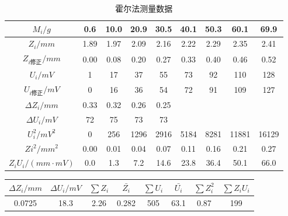 \documentclass[11pt]{article}
\begin{document}
\begin{table}[H]
    \centering
    \caption{霍尔法测量数据}
    \begin{tabular}{|c|c|c|c|c|c|c|c|c|}
    \hline
        $M_i/g$ & 0.6  & 10.0  & 20.9  & 30.5  & 40.1  & 50.3  & 60.1  & 69.9  \\ \hline
        $Z_i/mm$ & 1.89  & 1.97  & 2.09  & 2.16  & 2.22  & 2.29  & 2.35  & 2.41  \\ \hline
        $Z_{i\text{修正}}/mm$ & 0.00  & 0.08  & 0.20  & 0.27  & 0.33  & 0.40  & 0.46  & 0.52  \\ \hline
        $U_i/mV$ & 1 & 17 & 37 & 55 & 73 & 92 & 110 & 128 \\ \hline
        $U_{i\text{修正}}/mV$ & 0 & 16 & 36 & 54 & 72 & 91 & 109 & 127 \\ \hline
        $\Delta Z_i/mm$& 0.33 & 0.32 & 0.26 & 0.25 & ~ & ~ & ~ & ~ \\ \hline
        $\Delta U_i/mV$  & 72 & 75 & 73 & 73 & ~ & ~ & ~ & ~ \\ \hline
        $U_i^2/mV^2$ & 0 & 256 & 1296 & 2916 & 5184 & 8281 & 11881 & 16129 \\ \hline
        $Zi^2/mm^2$ & 0.00  & 0.01  & 0.04  & 0.07  & 0.11  & 0.16  & 0.21  & 0.27  \\ \hline
        $Z_iU_i/(mm\cdot mV)$ & 0.0  & 1.3  & 7.2  & 14.6  & 23.8  & 36.4  & 50.1  & 66.0 \\ \hline
    \end{tabular}
\end{table}
\begin{table}[H]
    \centering
    \begin{tabular}{|c|c|c|c|c|c|c|c|}
    \hline
        $\Delta Z_i/mm$ & $\Delta U_i/mV$ & $\sum Z_i$ & $\bar{Z_i}$  & $\sum U_i$ & $\bar{U_i}$  & $\sum Z_i^2$ & $\sum Z_i U_i$ \\ \hline
        0.0725 & 18.3 & 2.26 & 0.282 & 505 & 63.1 & 0.87 & 199 \\ \hline
    \end{tabular}
\end{table}
\end{document}
